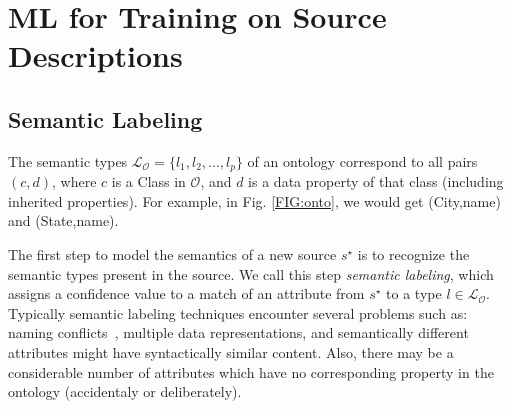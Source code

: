 \documentclass[letterpaper]{article} %
\newcommand{\authornote}[3]{
  {\fbox{\sc 
  #1}:$\blacktriangleright$\textcolor{#2}{\small{#3}}$\blacktriangleleft$}%
}
\newcommand{\ddg}[1]{\authornote{DDG}{blue}{#1}}
\begin{document}
\section{ML for Training on Source Descriptions \label{SEC:ML}}


\subsection{Semantic Labeling}
The semantic types $\mathcal{L_O} = \{l_1, l_2, ..., l_p\}$ of an ontology 
correspond to all pairs $(c,d)$, where $c$ is a Class in $\mathcal{O}$, and $d$ 
is a data property of that class (including inherited properties). 
For example, in Fig. \ref{FIG:onto}, we would get
(City,name) and (State,name).

The first step to model the semantics of a new source $s^\star$ is to recognize the semantic types present in the source. 
We call this step \emph{semantic labeling}, which assigns a confidence value to a match of an attribute from $s^\star$ to a type $l \in 
\mathcal{L_O}$.
Typically semantic labeling techniques encounter several problems such as:
naming conflicts~\cite{Pinkel:rodi}, multiple data representations, and semantically different attributes might have syntactically similar 
content.%
Also, there may be a considerable number of attributes which have no 
corresponding property in the ontology (accidentaly or deliberately).
\end{document}
